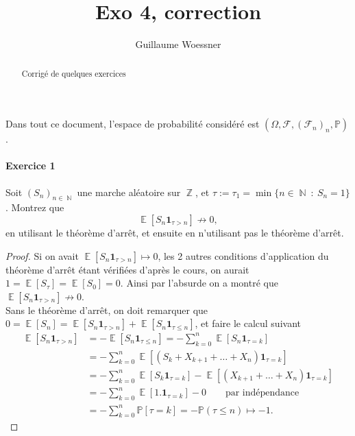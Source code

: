 \documentclass{article}
\title{Exo 4, correction}
\author{Guillaume Woessner}
\date{}                       %
\theoremstyle{definition}
\numberwithin{equation}{section}
\DeclareMathOperator{\Z}{\mathbb{Z}}
\DeclareMathOperator{\N}{\mathbb{N}}
\DeclareMathOperator{\E}{\mathbb{E}}
\begin{document}
\maketitle                    %

\begin{abstract}
\begin{center}
Corrigé de quelques exercices
\end{center}
\end{abstract}



Dans tout ce document, l'espace de probabilité considéré est $(\Omega,\mathcal{F},(\mathcal{F}_n)_n,\mathbb{P})$.



\paragraph{Exercice 1} 
Soit $(S_n)_{n\in \N}$ une marche aléatoire sur $\Z$, et $\tau:=\tau_1 = \min\{n\in\N~:~S_n=1\}$. Montrez que 
$$\E[S_n\mathbf{1}_{\tau>n}]\nrightarrow 0,$$
en utilisant le théorème d'arrêt, et ensuite en n'utilisant pas le théorème d'arrêt.

\begin{proof}
Si on avait $\E[S_n\mathbf{1}_{\tau>n}]\mapsto 0$, les 2 autres conditions d'application du théorème d'arrêt étant vérifiées d'après le cours, on aurait $1=\E[S_\tau]=\E[S_0]=0$. Ainsi par l'absurde on a montré que $\E[S_n\mathbf{1}_{\tau>n}]\nrightarrow 0$.\\
Sans le théorème d'arrêt, on doit remarquer que $0=\E[S_n]=\E[S_n\mathbf{1}_{\tau>n}]+\E[S_n\mathbf{1}_{\tau\leq n}]$, et faire le calcul suivant
\begin{align*}
\E[S_n\mathbf{1}_{\tau>n}]&= -\E[S_n\mathbf{1}_{\tau\leq n}] = -\sum_{k=0}^n \E[S_n\mathbf{1}_{\tau=k}]\\
&= -\sum_{k=0}^n \E[(S_k + X_{k+1}+\dots+X_n)\mathbf{1}_{\tau=k}] \\
&= -\sum_{k=0}^n \E[S_k \mathbf{1}_{\tau=k}] - \E[(X_{k+1}+\dots+X_n)\mathbf{1}_{\tau=k}]\\
&= -\sum_{k=0}^n \E[1. \mathbf{1}_{\tau=k}] - 0 \qquad \text{par indépendance}\\
&= -\sum_{k=0}^n \mathbb{P}[\tau=k] = -\mathbb{P}(\tau \leq n) \mapsto -1.
\end{align*}
\end{proof}
\end{document}
